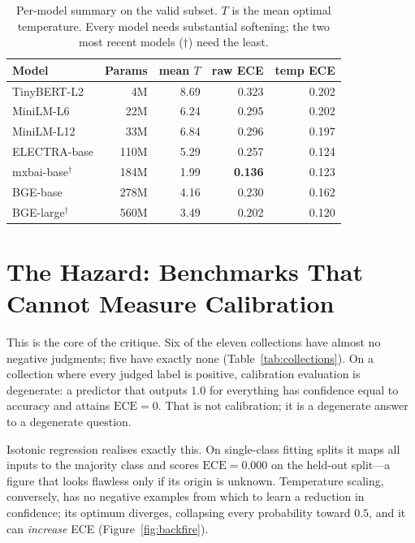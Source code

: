 \documentclass[sigconf,nonacm]{acmart}
\newcommand{\thead}[1]{\textbf{#1}}
\newcommand{\ece}{\mathrm{ECE}}
\begin{document}
\begin{table}[t]
\centering
\caption{Per-model summary on the valid subset. $T$ is the mean optimal temperature.
Every model needs substantial softening; the two most recent models ($\dagger$) need
the least.}\label{tab:permodel}
\small
\begin{tabular}{lrrrr}
\toprule
\thead{Model} & \thead{Params} & \thead{mean $T$} & \thead{raw ECE} & \thead{temp ECE} \\
\midrule
TinyBERT-L2  & 4M   & 8.69 & 0.323 & 0.202 \\
MiniLM-L6    & 22M  & 6.24 & 0.295 & 0.202 \\
MiniLM-L12   & 33M  & 6.84 & 0.296 & 0.197 \\
ELECTRA-base & 110M & 5.29 & 0.257 & 0.124 \\
mxbai-base$^{\dagger}$   & 184M & 1.99 & \textbf{0.136} & 0.123 \\
BGE-base     & 278M & 4.16 & 0.230 & 0.162 \\
BGE-large$^{\dagger}$    & 560M & 3.49 & 0.202 & 0.120 \\
\bottomrule
\end{tabular}
\end{table}

\section{The Hazard: Benchmarks That Cannot Measure Calibration}\label{sec:hazard}

This is the core of the critique. Six of the eleven collections have almost no
negative judgments; five have exactly none (Table~\ref{tab:collections}). On a
collection where every judged label is positive, calibration evaluation is degenerate:
a predictor that outputs $1.0$ for everything has confidence equal to accuracy and
attains $\ece = 0$. That is not calibration; it is a degenerate answer to a degenerate
question.

Isotonic regression realises exactly this. On single-class fitting splits it maps all
inputs to the majority class and scores $\ece = 0.000$ on the held-out split---a
figure that looks flawless only if its origin is unknown. Temperature scaling,
conversely, has no negative examples from which to learn a reduction in confidence;
its optimum diverges, collapsing every probability toward $0.5$, and it can
\emph{increase} ECE (Figure~\ref{fig:backfire}).
\end{document}
